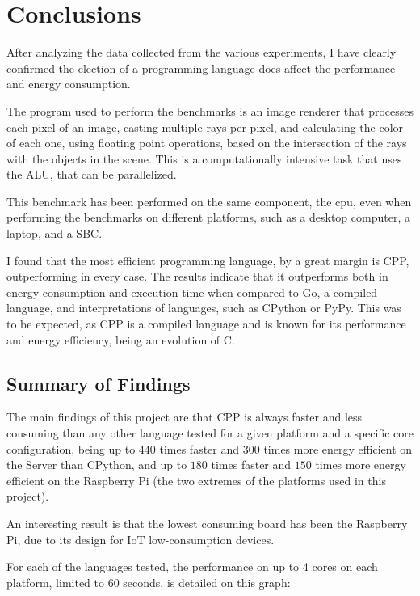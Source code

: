 \chapter{Conclusions}\label{chap:conclusions}

After analyzing the data collected from the various experiments, I have clearly confirmed the election of a programming language does affect the performance and energy consumption. 

The program used to perform the benchmarks is an image renderer that processes each pixel of an image, casting multiple rays per pixel, and calculating the color of each one, using floating point operations, based on the intersection of the rays with the objects in the scene. This is a computationally intensive task that uses the \gls{ALU}, that can be parallelized.

This benchmark has been performed on the same component, the \gls{cpu}, even when performing the benchmarks on different platforms, such as a desktop computer, a laptop, and a \gls{SBC}.

I found that the most efficient programming language, by a great margin is \gls{CPP}, outperforming in every case. The results indicate that it outperforms both in energy consumption and execution time when compared to Go, a compiled language, and interpretations of languages, such as \gls{CPython} or PyPy. This was to be expected, as \gls{CPP} is a compiled language and is known for its performance and energy efficiency, being an evolution of C.


\section{Summary of Findings}
The main findings of this project are that \gls{CPP} is always faster and less consuming than any other language tested for a given platform and a specific core configuration, being up to $440$ times faster and $300$ times more energy efficient on the Server than \gls{CPython}, and up to $180$ times faster and $150$ times more energy efficient on the Raspberry Pi (the two extremes of the platforms used in this project).

An interesting result is that the lowest consuming board has been the Raspberry Pi, due to its design for IoT low-consumption devices. 

For each of the languages tested, the performance on up to 4 cores on each platform, limited to 60 seconds, is detailed on this graph:

